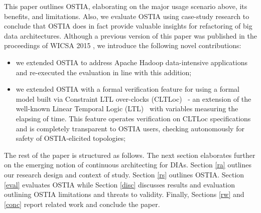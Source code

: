 This paper outlines OSTIA, elaborating on the major usage scenario above, its benefits, and limitations. Also, we evaluate OSTIA using case-study research to conclude that OSTIA does in fact provide valuable insights for refactoring of big data architectures.
Although a previous version of this paper was published in the proceedings of WICSA 2015 \cite{wicsabd}, we introduce the following novel contributions:
\begin{itemize}
\item we extended OSTIA to address Apache Hadoop data-intensive applications and re-executed the evaluation in line with this addition;
\item we extended OSTIA with a formal verification feature for using a formal model built via Constraint LTL over-clocks (CLTLoc)~\cite{BRS15} - an extension of the well-known Linear Temporal Logic (LTL)~\cite{ltl} with variables measuring the elapsing of time. This feature operates verification on CLTLoc specifications and is completely transparent to OSTIA users, checking autonomously for  safety of OSTIA-elicited topologies;
\end{itemize}

The rest of the paper is structured as follows. The next section elaborates further on the emerging notion of continuous architecting for DIAs. Section \ref{ra} outlines our research design and context of study. Section \ref{rs} outlines OSTIA. Section \ref{eval} evaluates OSTIA while Section \ref{disc} discusses results and evaluation outlining OSTIA limitations and threats to validity. Finally, Sections \ref{rw} and \ref{conc} report related work and conclude the paper.

